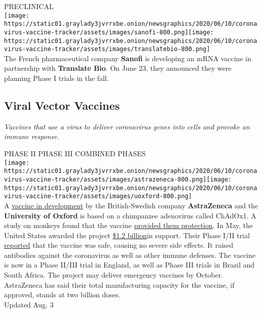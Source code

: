 PRECLINICAL\\
\texttt{[image: https://static01.graylady3jvrrxbe.onion/newsgraphics/2020/06/10/coronavirus-vaccine-tracker/assets/images/sanofi-800.png]}\texttt{[image: https://static01.graylady3jvrrxbe.onion/newsgraphics/2020/06/10/coronavirus-vaccine-tracker/assets/images/translatebio-800.png]}\\
The French pharmaceutical company \textbf{Sanofi} is developing an mRNA
vaccine in partnership with \textbf{Translate Bio}. On June 23, they
announced they were planning Phase I trials in the fall.

\hypertarget{viral-vector-vaccines}{%
\subsection{\texorpdfstring{\textbf{Viral Vector
Vaccines}}{Viral Vector Vaccines}}\label{viral-vector-vaccines}}

\emph{Vaccines that use a virus to deliver coronavirus genes into cells
and provoke an immune response.}

PHASE II PHASE III COMBINED PHASES\\
\texttt{[image: https://static01.graylady3jvrrxbe.onion/newsgraphics/2020/06/10/coronavirus-vaccine-tracker/assets/images/astrazeneca-800.png]}\texttt{[image: https://static01.graylady3jvrrxbe.onion/newsgraphics/2020/06/10/coronavirus-vaccine-tracker/assets/images/uoxford-800.png]}\\
A
\href{https://www.nytimes3xbfgragh.onion/2020/04/27/world/europe/coronavirus-vaccine-update-oxford.html}{vaccine
in development} by the British-Swedish company \textbf{AstraZeneca} and
the \textbf{University of Oxford} is based on a chimpanzee adenovirus
called ChAdOx1. A study on monkeys found that the vaccine
\href{https://www.nytimes3xbfgragh.onion/2020/07/30/health/covid-19-vaccine-monkeys.html}{provided
them protection}. In May, the United States awarded the project
\href{https://www.nytimes3xbfgragh.onion/2020/05/21/health/coronavirus-vaccine-astrazeneca.html?searchResultPosition=7}{\$1.2
billion}in support. Their Phase I/II trial
\href{https://www.thelancet.com/lancet/article/s0140-6736(20)31604-4}{reported}
that the vaccine was safe, causing no severe side effects. It raised
antibodies against the coronavirus as well as other immune defenses. The
vaccine is now in a Phase II/III trial in England, as well as Phase III
trials in Brazil and South Africa. The project may deliver emergency
vaccines by October. AstraZeneca has said their total manufacturing
capacity for the vaccine, if approved, stands at two billion doses.\\
Updated Aug. 3

